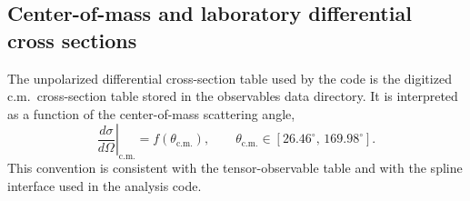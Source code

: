 \documentclass[11pt,a4paper]{article}
\begin{document}
\subsection{Center-of-mass and laboratory differential cross sections}
\label{sec:cm_lab_cross_section}

The unpolarized differential cross-section table used by the code is the digitized c.m.\ cross-section table stored in the observables data directory. It is interpreted as a function of the center-of-mass scattering angle,
\begin{equation}
\left.\frac{d\sigma}{d\Omega}\right|_{\mathrm{c.m.}}
=
f(\theta_{\mathrm{c.m.}}),
\qquad
\theta_{\mathrm{c.m.}} \in [26.46^\circ,\,169.98^\circ].
\label{eq:cm_cross_section_definition}
\end{equation}
This convention is consistent with the tensor-observable table and with the spline interface used in the analysis code.
\end{document}

